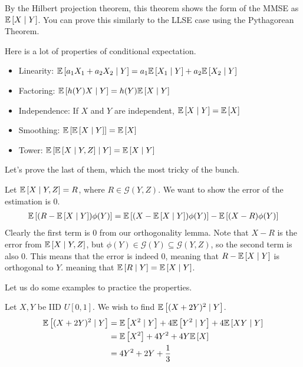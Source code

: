 By the Hilbert projection theorem, this theorem shows the form of the MMSE as $\mathbb{E}\left[ X \mid Y \right]$. You can prove this similarly to the LLSE case using the
Pythagorean Theorem.

Here is a lot of properties of conditional expectation.

\begin{theorem}
    \begin{itemize}
        \item Linearity: $\mathbb{E}\left[ a_1 X_1 + a_2 X_2 \mid Y \right] = a_1 \mathbb{E}\left[ X_1 \mid Y \right] + a_2 \mathbb{E}\left[ X_2 \mid Y \right]$
        \item Factoring: $\mathbb{E}\left[ h(Y) X \mid Y \right] = h(Y) \mathbb{E}\left[ X \mid Y \right]$
        \item Independence: If $X$ and $Y$ are independent, $\mathbb{E}\left[ X \mid Y \right] = \mathbb{E}\left[ X \right]$
        \item Smoothing: $\mathbb{E}\left[ \mathbb{E}\left[ X \mid Y \right] \right] = \mathbb{E}\left[ X \right]$
        \item Tower: $\mathbb{E}\left[ \mathbb{E}\left[ X \mid Y, Z \right] \mid Y \right] = \mathbb{E}\left[ X \mid Y \right]$
    \end{itemize}
    Let's prove the last of them, which the most tricky of the bunch.

    \begin{proof*}
        Let $\mathbb{E}\left[ X \mid Y, Z \right] = R$, where $R \in \mathcal{G}(Y, Z)$. We want to show the error of the estimation is 0.
        \begin{align*}
            \mathbb{E}\left[ (R - \mathbb{E}\left[ X \mid Y \right]) \phi(Y) \right] &= \mathbb{E}\left[ (X - \mathbb{E}\left[ X \mid Y \right]) \phi(Y) \right] - \mathbb{E}\left[ (X - R) \phi(Y) \right] \\
        \end{align*}
        Clearly the first term is 0 from our orthogonality lemma. Note that $X - R$ is the error from $\mathbb{E}\left[ X \mid Y, Z \right]$,
        but $\phi(Y) \in \mathcal{G}(Y) \subseteq \mathcal{G}(Y, Z)$, so the second term is also 0. This means that the error is indeed 0,
        meaning that $R - \mathbb{E}\left[ X \mid Y \right]$ is orthogonal to $Y$. meaning that $\mathbb{E}\left[ R \mid Y \right] = \mathbb{E}\left[ X \mid Y \right]$.
    \end{proof*}
\end{theorem}

Let us do some examples to practice the properties.

\begin{example}
    Let $X, Y$ be IID $U[0, 1]$. We wish to find $\mathbb{E}\left[ (X + 2Y)^2 \mid Y \right]$.
    \begin{align*}
        \mathbb{E}\left[ (X + 2Y)^2 \mid Y \right] &= \mathbb{E}\left[ X^2 \mid Y \right] + 4 \mathbb{E}\left[ Y^2 \mid Y \right] + 4 \mathbb{E}\left[ XY \mid Y \right] \\
        &= \mathbb{E}\left[ X^2 \right] + 4Y^2 + 4Y\mathbb{E}\left[ X \right] \\
        &= 4Y^2 + 2Y + \frac13
    \end{align*}
\end{example}

